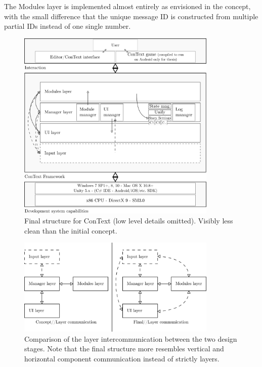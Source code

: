 The Modules layer is implemented almost entirely as envisioned in the concept, with the small difference that the unique message ID is constructed from multiple partial IDs instead of one single number.

\begin{figure}[h]
\centering
\includegraphics[width=0.85\textwidth]{figures/final.png}
\caption[Final structure for ConText]{Final structure for ConText (low level details omitted). Visibly less clean than the initial concept.}\label{fig:final}
\end{figure}

\begin{figure}[h]
\centering
\includegraphics[width=0.85\textwidth]{figures/conceptVSfinal.png}
\caption[Layer comm. comparison concept vs final]{Comparison of the layer intercommunication between the two design stages. Note that the final structure more resembles vertical and horizontal component communication instead of strictly layers.}\label{fig:layerConceptVSFinal}
\end{figure}

